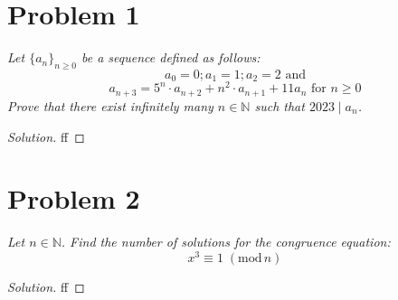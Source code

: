 \documentclass{article}
\newcommand{\N}{{\mathbb N}}
\begin{document}
\section{Problem 1}
{\it Let $\{a_n\}_{n\geq 0}$ be a sequence defined as follows:
\[
	a_0 = 0; a_1 = 1; a_2 = 2 \text{ and}
\]
\[
	a_{n+3} = 5^n\cdot a_{n+2} + n^2\cdot a_{n+1} + 11a_n
	\text{ for }n\geq 0
\]
Prove that there exist infinitely many $n \in \N$
such that $2023 \mid a_n$.
}
\begin{proof}[Solution]\let\qed\relax
	ff
\end{proof}
\clearpage

\section{Problem 2}
{\it Let $n \in \N$.
Find the number of solutions for the congruence equation:
\[
	x^3 \equiv 1 \; (\mathrm{mod}\, n)
\]
}
\begin{proof}[Solution]\let\qed\relax
	ff
\end{proof}
\clearpage
\end{document}
